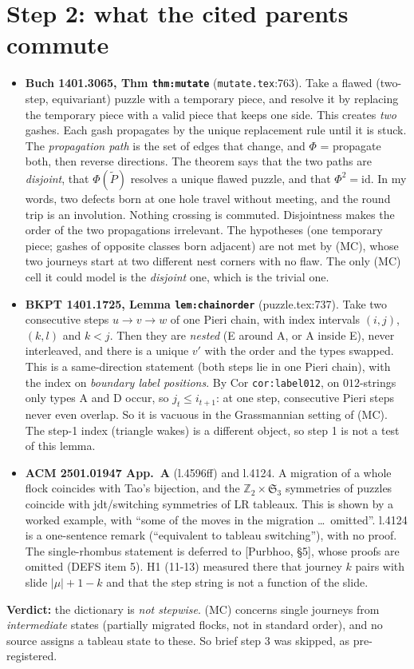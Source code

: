 \documentclass[11pt]{article}
\theoremstyle{definition}
\begin{document}
\section{Step 2: what the cited parents commute}
\begin{itemize}
\item \textbf{Buch 1401.3065, Thm \texttt{thm:mutate}} (\texttt{mutate.tex}:763). Take a flawed (two-step, equivariant) puzzle with a temporary
piece, and resolve it by replacing the temporary piece with a valid piece that keeps one side. This creates \emph{two} gashes. Each gash
propagates by the unique replacement rule until it is stuck. The \emph{propagation path} is the set of edges that change, and $\Phi$ = propagate
both, then reverse directions. The theorem says that the two paths are \emph{disjoint}, that $\Phi(\tilde P)$ resolves a unique flawed puzzle,
and that $\Phi^2=\mathrm{id}$. In my words, two defects born at one hole travel without meeting, and the round trip is an involution. Nothing
crossing is commuted. Disjointness makes the order of the two propagations irrelevant. The hypotheses (one temporary piece; gashes of
opposite classes born adjacent) are not met by (MC), whose two journeys start at two different nest corners with no flaw. The only (MC) cell
it could model is the \emph{disjoint} one, which is the trivial one.
\item \textbf{BKPT 1401.1725, Lemma \texttt{lem:chainorder}} (puzzle.tex:737). Take two consecutive steps $u\to v\to w$ of one Pieri chain, with
index intervals $(i,j)$, $(k,l)$ and $k<j$. Then they are \emph{nested} (E around A, or A inside E), never interleaved, and there is a unique
$v'$ with the order and the types swapped. This is a same-direction statement (both steps lie in one Pieri chain), with the index on
\emph{boundary label positions}. By Cor \texttt{cor:label012}, on $012$-strings only types A and D occur, so $j_t\le i_{t+1}$: at one step,
consecutive Pieri steps never even overlap. So it is vacuous in the Grassmannian setting of (MC). The step-1 index (triangle wakes) is a
different object, so step 1 is not a test of this lemma.
\item \textbf{ACM 2501.01947 App.~A} (l.4596ff) and l.4124. A migration of a whole flock coincides with Tao's bijection, and the
$\mathbb Z_2\times\mathfrak S_3$ symmetries of puzzles coincide with jdt/switching symmetries of LR tableaux. This is shown by a worked example, with
``some of the moves in the migration \ldots\ omitted''. l.4124 is a one-sentence remark (``equivalent to tableau switching''), with no proof. The
single-rhombus statement is deferred to [Purbhoo, \S5], whose proofs are omitted (DEFS item 5). H1 (11-13) measured there that journey $k$ pairs with
slide $|\mu|+1-k$ and that the step string is not a function of the slide.
\end{itemize}
\textbf{Verdict:} the dictionary is \emph{not stepwise}. (MC) concerns single journeys from \emph{intermediate} states (partially migrated
flocks, not in standard order), and no source assigns a tableau state to these. So brief step 3 was skipped, as pre-registered.
\end{document}
